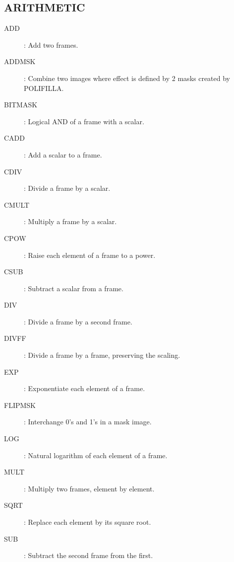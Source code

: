 \subsection {ARITHMETIC}
\begin{description}
\begin{description}
\item [ADD]: Add two frames.
\item [ADDMSK]: Combine two images where effect is defined by 2 masks
created by POLIFILLA.
\item [BITMASK]: Logical AND of a frame with a scalar.
\item [CADD]: Add a scalar to a frame.
\item [CDIV]: Divide a frame by a scalar.
\item [CMULT]: Multiply a frame by a scalar.
\item [CPOW]: Raise each element of a frame to a power.
\item [CSUB]: Subtract a scalar from a frame.
\item [DIV]: Divide a frame by a second frame.
\item [DIVFF]: Divide a frame by a frame, preserving the scaling.
\item [EXP]: Exponentiate each element of a frame.
\item [FLIPMSK]: Interchange 0's and 1's in a mask image.
\item [LOG]: Natural logarithm of each element of a frame.
\item [MULT]: Multiply two frames, element by element.
\item [SQRT]: Replace each element by its square root.
\item [SUB]: Subtract the second frame from the first.
\end{description}
\end{description}
